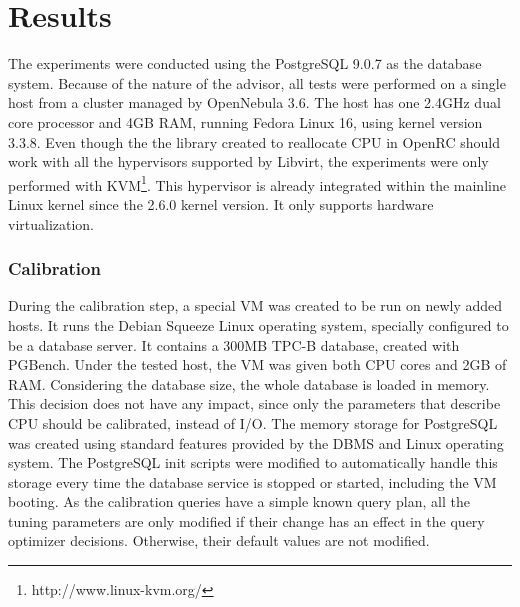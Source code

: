 \chapter{Results}

\label{chap:results}

The experiments were conducted using the PostgreSQL 9.0.7 as the database system. Because of the nature of the advisor, all tests were performed on a single host from a cluster managed by OpenNebula 3.6. The host has one 2.4GHz dual core processor and 4GB RAM, running Fedora Linux 16, using kernel version 3.3.8. Even though the the library created to reallocate CPU in OpenRC should work with all the hypervisors supported by Libvirt, the experiments were only performed with KVM\footnote{http://www.linux-kvm.org/}. This hypervisor is already integrated within the mainline Linux kernel since the 2.6.0 kernel version. It only supports hardware virtualization.

\subsection{Calibration}

During the calibration step, a special VM was created to be run on newly added hosts. It runs the Debian Squeeze Linux operating system, specially configured to be a database server. It contains a 300MB TPC-B database, created with PGBench. Under the tested host, the VM was given both CPU cores and 2GB of RAM. Considering the database size, the whole database is loaded in memory. This decision does not have any impact, since only the parameters that describe CPU should be calibrated, instead of I/O. The memory storage for PostgreSQL was created using standard features provided by the DBMS and Linux operating system. The PostgreSQL init scripts were modified to automatically handle this storage every time the database service is stopped or started, including the VM booting. As the calibration queries have a simple known query plan, all the tuning parameters are only modified if their change has an effect in the query optimizer decisions. Otherwise, their default values are not modified.

